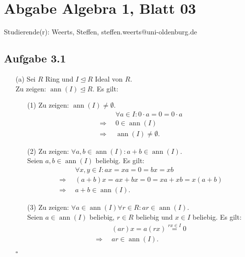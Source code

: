 \documentclass[12pt]{article}
\newcommand{\QED}{\begin{flushright} $\square$ \end{flushright}}
\newcommand{\df}{\enspace\Longrightarrow\enspace}
\newcommand{\isIdeal}{\trianglelefteq}
\newcommand{\ann}{\operatorname{ann}}
\begin{document}
\section*{Abgabe Algebra 1, Blatt 03}

Studierende(r): Weerts, Steffen, steffen.weerts@uni-oldenburg.de

\subsection*{Aufgabe 3.1}
\begin{enumerate}
	\item[(a)] Sei $R$ Ring und $I\isIdeal R$ Ideal von $R$. \\
	Zu zeigen: $\ann(I)\isIdeal R$. Es gilt:
	\begin{enumerate}
		\item[(1)] Zu zeigen: $\ann(I)\neq\emptyset$.
		\begin{align*}
			&\forall a\in I:0\cdot a=0=0\cdot a \\
			\df &0\in\ann(I) \\
			\df &\ann(I)\neq\emptyset.
		\end{align*}
		
		\item[(2)] Zu zeigen: $\forall a,b\in\ann(I):a+b\in\ann(I)$. \\
		Seien $a,b\in\ann(I)$ beliebig. Es gilt:
		\begin{align*}
			&\forall x,y\in I: ax=xa=0=bx=xb \\
			\df &(a+b)x=ax+bx=0=xa+xb=x(a+b) \\
			\df &a+b\in\ann(I).
		\end{align*}
		
		\item[(3)] Zu zeigen: $\forall a\in\ann(I)\forall r\in R:ar\in\ann(I)$. \\
		Seien $a\in\ann(I)$ beliebig, $r\in R$ beliebig und $x\in I$ beliebig. Es gilt:
		\begin{align*}
			&(ar)x=a(rx) \overset{rx\in I}{=}0 \\
			\df &ar\in\ann(I).
		\end{align*}
	\end{enumerate}
	\QED
	

\end{enumerate}
\end{document}
